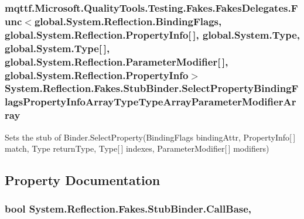 \hypertarget{class_system_1_1_reflection_1_1_fakes_1_1_stub_binder_aa5b342cf78926641e0510eca4ed6d9c8}{
\subsubsection[{Select\-Property\-Binding\-Flags\-Property\-Info\-Array\-Type\-Type\-Array\-Parameter\-Modifier\-Array}]{\setlength{\rightskip}{0pt plus 5cm}mqttf.\-Microsoft.\-Quality\-Tools.\-Testing.\-Fakes.\-Fakes\-Delegates.\-Func$<$global.\-System.\-Reflection.\-Binding\-Flags, global.\-System.\-Reflection.\-Property\-Info\mbox{[}$\,$\mbox{]}, global.\-System.\-Type, global.\-System.\-Type\mbox{[}$\,$\mbox{]}, global.\-System.\-Reflection.\-Parameter\-Modifier\mbox{[}$\,$\mbox{]}, global.\-System.\-Reflection.\-Property\-Info$>$ System.\-Reflection.\-Fakes.\-Stub\-Binder.\-Select\-Property\-Binding\-Flags\-Property\-Info\-Array\-Type\-Type\-Array\-Parameter\-Modifier\-Array}}\label{class_system_1_1_reflection_1_1_fakes_1_1_stub_binder_aa5b342cf78926641e0510eca4ed6d9c8}


Sets the stub of Binder.\-Select\-Property(\-Binding\-Flags binding\-Attr, Property\-Info\mbox{[}$\,$\mbox{]} match, Type return\-Type, Type\mbox{[}$\,$\mbox{]} indexes, Parameter\-Modifier\mbox{[}$\,$\mbox{]} modifiers)



\subsection{Property Documentation}
\hypertarget{class_system_1_1_reflection_1_1_fakes_1_1_stub_binder_aca61daf2798a1da4828fe3ed915e0591}{
\subsubsection[{Call\-Base}]{\setlength{\rightskip}{0pt plus 5cm}bool System.\-Reflection.\-Fakes.\-Stub\-Binder.\-Call\-Base\hspace{0.3cm}{\ttfamily [get]}, {\ttfamily [set]}}}\label{class_system_1_1_reflection_1_1_fakes_1_1_stub_binder_aca61daf2798a1da4828fe3ed915e0591}


